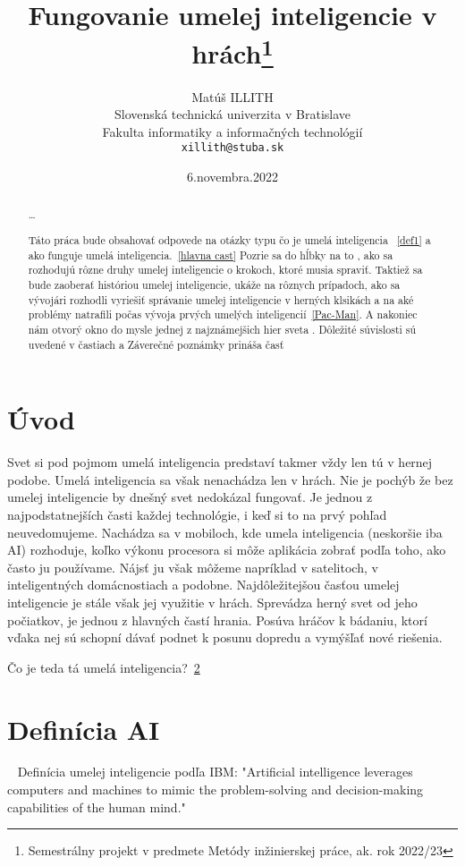 \documentclass[10pt,oneside,slovak,a4paper]{article}
\title{Fungovanie umelej inteligencie v hrách\thanks{Semestrálny projekt v predmete Metódy inžinierskej práce, ak. rok 2022/23}} %
\author{Matúš ILLITH\\[2pt]
	{\small Slovenská technická univerzita v Bratislave}\\
	{\small Fakulta informatiky a informačných technológií}\\
	{\small \texttt{xillith@stuba.sk}}
	}
\date{\small 6.novembra.2022}
\begin{document}
\maketitle

\begin{abstract}
\ldots


Táto práca bude obsahovať odpovede na otázky typu čo je umelá inteligencia ~\ref{def1} a ako funguje umelá inteligencia.~\ref{hlavna cast} Pozrie sa do hĺbky na to , ako sa rozhodujú rôzne druhy umelej inteligencie o krokoch, ktoré musia spraviť. 
Taktiež sa bude zaoberať históriou umelej inteligencie, ukáže na rôznych prípadoch,  ako sa vývojári rozhodli vyriešiť správanie umelej inteligencie v herných klsikách a na aké problémy natrafili počas vývoja prvých umelých inteligencií~\ref{Pac-Man}.
A nakoniec nám otvorý okno do mysle jednej z najznámejšich hier sveta .
Dôležité súvislosti sú uvedené v častiach a
Záverečné poznámky prináša časť

\end{abstract}

\vspace{1cm}

\section{Úvod}

Svet si pod pojmom umelá inteligencia predstaví takmer vždy len tú v hernej podobe. Umelá inteligencia sa však nenachádza len v hrách. Nie je pochýb že bez umelej inteligencie by dnešný svet nedokázal fungovať. Je jednou z najpodstatnejších časti každej technológie, i keď si to na prvý pohľad neuvedomujeme. Nachádza sa v mobiloch, kde umela inteligencia (neskoršie iba AI) rozhoduje, koľko výkonu procesora si môže aplikácia zobrať podľa toho, ako často ju používame. Nájsť ju však môžeme napríklad v satelitoch, v inteligentných domácnostiach a podobne. Najdôležitejšou časťou umelej inteligencie je stále však jej využitie v hrách. Sprevádza herný svet od jeho počiatkov, je jednou z hlavných častí hrania. Posúva hráčov k bádaniu,  ktorí vďaka nej sú schopní dávať podnet k posunu dopredu a vymýšľať nové riešenia.

Čo je teda tá umelá inteligencia?~\ref{def1}


\newpage

\section{Definícia AI} \label{def1}
~\cite{3.zdroj}
Definícia umelej inteligencie podľa IBM:
"Artificial intelligence leverages computers and machines to mimic the problem-solving and decision-making capabilities of the human mind."
\end{document}
